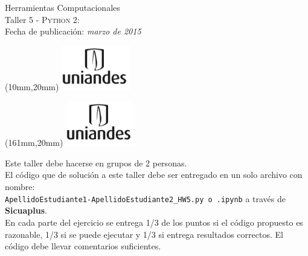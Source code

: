 \documentclass[11pt,letterpaper]{exam}
\begin{document}
\begin{center}
{\Large Herramientas Computacionales} \\
Taller 5 - \textsc{Python 2}:\\
Fecha de publicación: {\small \it marzo de 2015}\\
\end{center}

\begin{textblock*}{40mm}(10mm,20mm)
  \includegraphics[width=3cm]{logoUniandes.png}
\end{textblock*}

\begin{textblock*}{40mm}(161mm,20mm)
  \includegraphics[width=3cm]{logoUniandes.png}
\end{textblock*}

\vspace{0.5cm}

\noindent Este taller debe hacerse en grupos de 2 personas.\\
El código que de solución a este taller debe ser entregado en un solo archivo con nombre:\\
 \verb+ApellidoEstudiante1-ApellidoEstudiante2_HW5.py o .ipynb+ a través de \textbf{Sicuaplus}.\\

En cada parte del ejercicio se entrega 1/3  de los puntos si el código propuesto es razonable, 1/3 si se puede ejecutar y 1/3 si entrega resultados correctos. El código debe llevar comentarios suficientes.

\vspace{0.5cm}
\end{document}
